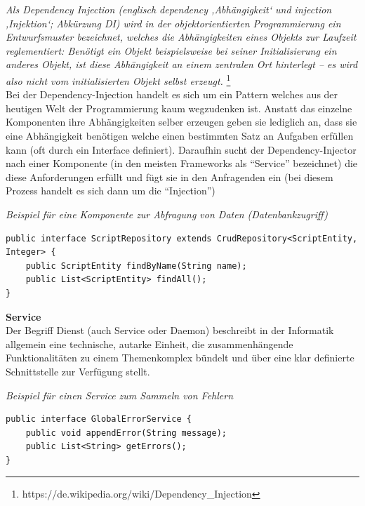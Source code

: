 \emph{\glqq   
Als Dependency Injection (englisch dependency ‚Abhängigkeit‘ und injection ‚Injektion‘; Abkürzung DI) wird in der objektorientierten Programmierung ein Entwurfsmuster bezeichnet, welches die Abhängigkeiten eines Objekts zur Laufzeit reglementiert: Benötigt ein Objekt beispielsweise bei seiner Initialisierung ein anderes Objekt, ist diese Abhängigkeit an einem zentralen Ort hinterlegt – es wird also nicht vom initialisierten Objekt selbst erzeugt. \grqq} \footnote{https://de.wikipedia.org/wiki/Dependency\_Injection} \\ 

Bei der Dependency-Injection handelt es sich um ein Pattern welches aus der heutigen Welt der Programmierung kaum wegzudenken ist. Anstatt das einzelne Komponenten ihre Abhängigkeiten selber erzeugen geben sie lediglich an, dass sie eine Abhängigkeit benötigen welche einen bestimmten Satz an Aufgaben erfüllen kann (oft durch ein Interface definiert). Daraufhin sucht der Dependency-Injector nach einer Komponente (in den meisten Frameworks als ``Service'' bezeichnet) die diese Anforderungen erfüllt und fügt sie in den Anfragenden ein (bei diesem Prozess handelt es sich dann um die ``Injection'') \\

\begin{minipage}{\textwidth}
\emph{Beispiel für eine Komponente zur Abfragung von Daten (Datenbankzugriff)}
\begin{lstlisting}
public interface ScriptRepository extends CrudRepository<ScriptEntity, Integer> {
	public ScriptEntity findByName(String name);
	public List<ScriptEntity> findAll();
}
\end{lstlisting} 
\end{minipage}


\textbf{Service}\\
Der Begriff Dienst (auch Service oder Daemon) beschreibt in der Informatik allgemein eine technische, autarke Einheit, die zusammenhängende Funktionalitäten zu einem Themenkomplex bündelt und über eine klar definierte Schnittstelle zur Verfügung stellt.\\
 
\begin{minipage}{\textwidth}
\emph{Beispiel für einen Service zum Sammeln von Fehlern}
\begin{lstlisting}
public interface GlobalErrorService {
	public void appendError(String message);
	public List<String> getErrors();
}
\end{lstlisting}
\end{minipage}

